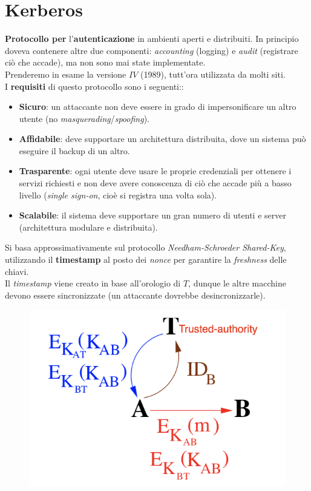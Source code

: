 \documentclass[11pt, a4paper, twoside, italian]{report}
\theoremstyle{plain}
\begin{document}
\section*{Kerberos}
\textbf{Protocollo per} l'\textbf{autenticazione} in ambienti aperti e distribuiti. In principio doveva contenere altre due componenti: \textit{accounting} (logging) e \textit{audit} (registrare ciò che accade), ma non sono mai state implementate.\\
Prenderemo in esame la versione $IV$ (1989), tutt'ora utilizzata da molti siti.\\
I \textbf{requisiti} di questo protocollo sono i seguenti::
\begin{itemize}
	\item \textbf{Sicuro}: un attaccante non deve essere in grado di impersonificare un altro utente (no \textit{masquerading}/\textit{spoofing}).
	\item \textbf{Affidabile}: deve supportare un architettura distribuita, dove un sistema può eseguire il backup di un altro.
	\item \textbf{Trasparente}: ogni utente deve usare le proprie credenziali per ottenere i servizi richiesti e non deve avere conoscenza di ciò che accade più a basso livello (\textit{single sign-on}, cioè si registra una volta sola).
	\item \textbf{Scalabile}: il sistema deve supportare un gran numero di utenti e server (architettura modulare e distribuita).
\end{itemize}
\begin{multicols}{2}
	\noindent
	Si basa approssimativamente sul protocollo \textit{Needham-Schroeder Shared-Key}, utilizzando il \textbf{timestamp} al posto dei \textit{nonce} per garantire la \textit{freshness} delle chiavi.\\
	Il \textit{timestamp} viene creato in base all'orologio di $T$, dunque le altre macchine devono essere sincronizzate (un attaccante dovrebbe desincronizzarle).
\columnbreak
	\begin{figure}[H]
		\centering
		\includegraphics[scale=0.45]{taut}
	\end{figure}
\end{multicols}
\end{document}
